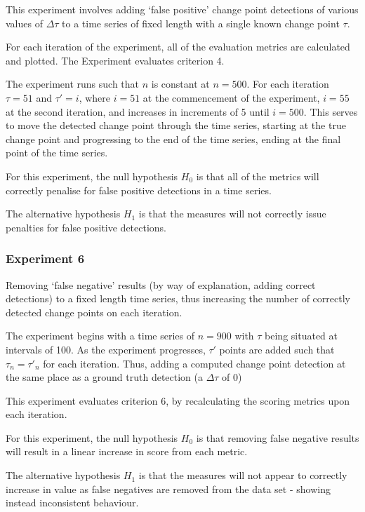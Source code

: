\documentclass[../main.tex]{subfiles}
\begin{document}
This experiment involves adding `false positive' change point detections of various values of $\Delta \tau$ to a time series of fixed length with a single known change point $\tau$.

For each iteration of the experiment, all of the evaluation metrics are calculated and plotted. The Experiment evaluates criterion 4.

The experiment runs such that $n$ is constant at $n=500$. For each iteration $\tau = 51$ and $\tau' = i$, where $i = 51$ at the commencement of the experiment, $i=55$ at the second iteration, and increases in increments of 5 until $i = 500$. This serves to move the detected change point through the time series, starting at the true change point and progressing to the end of the time series, ending at the final point of the time series.

For this experiment, the null hypothesis $H_0$ is that all of the metrics will correctly penalise for false positive detections in a time series.

The alternative hypothesis $H_1$ is that the measures will not correctly issue penalties for false positive detections.

\subsubsection{Experiment 6}

Removing `false negative' results (by way of explanation, adding correct detections) to a fixed length time series, thus increasing the number of correctly detected change points on each iteration.

The experiment begins with a time series of $n=900$ with $\tau$ being situated at intervals of 100. As the experiment progresses, $\tau'$ points are added such that $\tau_n = \tau'_n$ for each iteration. Thus, adding a computed change point detection at the same place as a ground truth detection (a $\Delta \tau$ of 0)

This experiment evaluates criterion 6, by recalculating the scoring metrics upon each iteration.

For this experiment, the null hypothesis $H_0$ is that removing false negative results will result in a linear increase in score from each metric.

The alternative hypothesis $H_1$ is that the measures will not appear to correctly increase in value as false negatives are removed from the data set - showing instead inconsistent behaviour.
\end{document}
